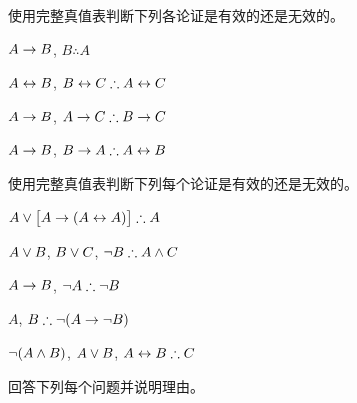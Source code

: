 \noindent\problempart
\label{pr.TT.valid2}
使用完整真值表判断下列各论证是有效的还是无效的。

\begin{compactlist}
\item $A\rightarrow B$, $B \therefore  A$ %

\item $A\leftrightarrow B$, $B\eiff C \therefore A\eiff C$ %

\item $A \rightarrow B$, $A \eif C\therefore B \eif C$ %

\item $A \rightarrow B$, $B \eif A\therefore A \eiff B$ %

\end{compactlist}

\noindent\problempart
\label{pr.TT.valid3}
使用完整真值表判断下列每个论证是有效的还是无效的。


\begin{compactlist}
\item $A\eor\bigl[A\eif(A\eiff A)\bigr] \therefore  A $\vspace{.5ex}%
\item $A\vee B$, $B\vee C$, $\enot B \therefore A \eand C$\vspace{.5ex} %
\item $A \rightarrow B$, $\enot A\therefore \enot B$ \vspace{.5ex}%
\item $A$, $B\therefore \enot(A\eif \enot B)$ \vspace{.5ex}%
\item $\neg(A \wedge B)$, $A \vee B$, $A \eiff B\therefore C$ \vspace{.5ex}%
\end{compactlist}

\solutions
\problempart
\label{pr.TT.concepts}
回答下列每个问题并说明理由。


